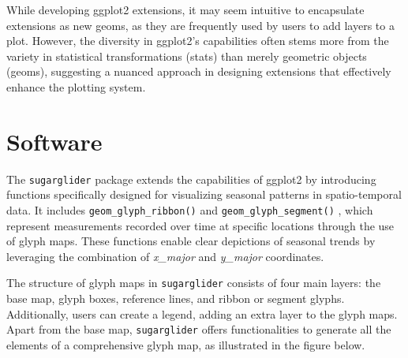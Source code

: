 While developing ggplot2 extensions, it may seem intuitive to encapsulate extensions as new geoms, as they are frequently used by users to add layers to a plot. However, the diversity in ggplot2's capabilities often stems more from the variety in statistical transformations (stats) than merely geometric objects (geoms), suggesting a nuanced approach in designing extensions that effectively enhance the plotting system.

\hypertarget{software}{%
\section{Software}\label{software}}

The \texttt{sugarglider} package extends the capabilities of ggplot2 by introducing functions specifically designed for visualizing seasonal patterns in spatio-temporal data. It includes \texttt{geom\_glyph\_ribbon()} and \texttt{geom\_glyph\_segment()} , which represent measurements recorded over time at specific locations through the use of glyph maps. These functions enable clear depictions of seasonal trends by leveraging the combination of \emph{x\_major} and \emph{y\_major} coordinates.

The structure of glyph maps in \texttt{sugarglider} consists of four main layers: the base map, glyph boxes, reference lines, and ribbon or segment glyphs. Additionally, users can create a legend, adding an extra layer to the glyph maps. Apart from the base map, \texttt{sugarglider} offers functionalities to generate all the elements of a comprehensive glyph map, as illustrated in the figure below.

